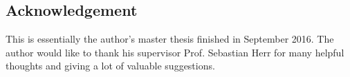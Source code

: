 \documentclass[reqno]{amsart}
\theoremstyle{Definitionl}
\theoremstyle{Definitionk}
\theoremstyle{definition}
\theoremstyle{Satzk}
\theoremstyle{Satzl}
\theoremstyle{Bemerkung}
\begin{document}
\subsection*{Acknowledgement} This is essentially the author's master thesis finished in September 2016. The author would like to thank his supervisor Prof. Sebastian Herr for many helpful thoughts and giving a lot of valuable suggestions.


\end{document}
